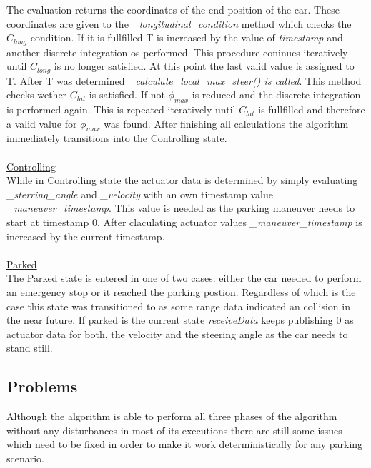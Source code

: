 \documentclass[paper=a4, fontsize=11pt]{scrreprt}
\begin{document}
The evaluation returns the coordinates of the end position of the car. These coordinates are given to the \textit{\_longitudinal\_condition} method which checks the $C_{long}$ condition. If it is fullfilled T is increased by the value of \textit{timestamp} and another discrete integration os performed. This procedure coninues iteratively until $C_{long}$ is no longer satisfied. At this point the last valid value is assigned to T. After T was determined \textit{\_calculate\_local\_max\_steer() is called}. This method checks wether $C_{lat}$ is satisfied. If not $\phi_{max}$ is reduced and the discrete integration is performed again. This is repeated iteratively until $C_{lat}$ is fullfilled and therefore a valid value for $\phi_{max}$ was found. After finishing all calculations the algorithm immediately transitions into the Controlling state.\\
\\
\underline{Controlling}\\
While in Controlling state the actuator data is determined by simply evaluating \textit{\_sterring\_angle} and \textit{\_velocity} with an own timestamp value \textit{\_maneuver\_timestamp}. This value is needed as the parking maneuver needs to start at timestamp 0. After claculating actuator values \textit{\_maneuver\_timestamp} is increased by the current timestamp.\\
\\
\underline{Parked}\\
The Parked state is entered in one of two cases: either the car needed to perform an emergency stop or it reached the parking postion. Regardless of which is the case this state was transitioned to as some range data indicated an collision in the near future. If parked is the current state \textit{receiveData} keeps publishing 0 as actuator data for both, the velocity and the steering angle as the car needs to stand still.
\subsection{Problems}
Although the algorithm is able to perform all three phases of the algorithm without any disturbances in most of its executions there are still some issues which need to be fixed in order to make it work deterministically for any parking scenario.
\end{document}

